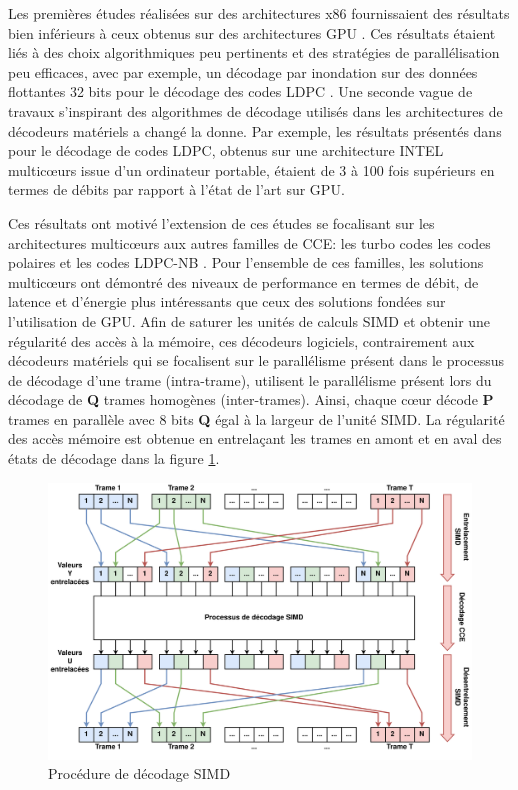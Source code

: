 \documentclass[../main.tex]{subfiles}
\begin{document}
Les premières études réalisées sur des architectures x86 fournissaient des résultats bien inférieurs à ceux obtenus sur des architectures GPU \cite{massive:gpu}. Ces résultats étaient liés à des choix algorithmiques peu pertinents et des stratégies de parallélisation peu efficaces, avec par exemple, un décodage par inondation sur des données flottantes 32 bits pour le décodage des codes LDPC \cite{Chang:ldpc}. Une seconde vague de travaux s’inspirant des algorithmes de décodage utilisés dans les architectures de décodeurs matériels a changé la donne. Par exemple, les résultats présentés dans \cite{LDPC:SOFT4} pour le décodage de codes LDPC, obtenus sur une architecture INTEL multicœurs issue d’un ordinateur portable, étaient de 3 à 100 fois supérieurs en termes de débits par rapport à l’état de l’art sur GPU.

Ces résultats ont motivé l’extension de ces études se focalisant sur les architectures multicœurs aux autres familles de CCE: les turbo codes \cite{Adrien} les codes polaires \cite{ri:LeG15a,mcgill} et les codes LDPC-NB \cite{BLG:LDPC:NB}. Pour l’ensemble de ces familles, les solutions multicœurs ont démontré des niveaux de performance en termes de débit, de latence et d’énergie plus intéressants que ceux des solutions fondées sur l’utilisation de GPU.
Afin de saturer les unités de calculs SIMD et obtenir une régularité des accès à la mémoire, ces décodeurs logiciels, contrairement aux décodeurs matériels qui se focalisent sur le parallélisme présent dans le processus de décodage d’une trame (intra-trame), utilisent le parallélisme présent lors du décodage de \textbf{Q} trames homogènes (inter-trames). Ainsi, chaque cœur décode \textbf{P} trames en parallèle avec 8 bits \times \textbf{Q} égal à la largeur de l’unité SIMD. La régularité des accès mémoire est obtenue en entrelaçant les trames en amont et en aval des états de décodage dans la figure \ref{fig:simd}.

\begin{figure}
    \centering
    \includegraphics[scale=.08]{figs/SIMD.png}
    \caption{Procédure de décodage SIMD}
    \label{fig:simd}
\end{figure}
\end{document}
